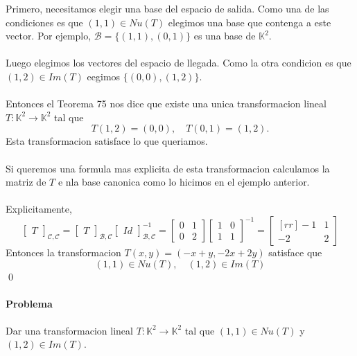\documentclass{article}
\theoremstyle{definition}
\theoremstyle{definition}
\theoremstyle{remark}
\begin{document}
Primero, necesitamos elegir una base del espacio de salida. Como una de las condiciones es que $(1,1) \in Nu(T)$ elegimos una base que contenga a este vector. Por ejemplo, $\mathcal{B}=\{(1,1),(0,1)\}$ es una base de $\mathbb{K}^2$. \\\\ Luego elegimos los vectores del espacio de llegada. Como la otra condicion es que $(1,2) \in Im(T)$ eegimos $\{(0,0),(1,2)\}$.\\\\ Entonces el Teorema 75 nos dice que existe una unica transformacion lineal $T : \mathbb{K}^2 \to \mathbb{K}^2$ tal que \[
T(1,2) =(0,0), \quad T(0,1)=(1,2).
\]
Esta transformacion satisface lo que queriamos. \\\\ Si queremos una formula mas explicita de esta transformacion calculamos la matriz de $T$ e nla base canonica como lo hicimos en el ejemplo anterior. \\\\ Explicitamente, \[
  \begin{bmatrix}T\end{bmatrix}_{\mathcal{C,C}}=\begin{bmatrix}T\end{bmatrix}_{\mathcal{B,C}}\begin{bmatrix}Id\end{bmatrix}_{\mathcal{B,C}}^{-1}=\begin{bmatrix}0 & 1 \\ 0 & 2 \end{bmatrix}\begin{bmatrix}1 & 0 \\ 1 & 1 \end{bmatrix}^{-1}=\begin{bmatrix}[rr] -1 & 1 \\ -2 & 2 \end{bmatrix}
\]
Entonces la transformacion $T(x,y)=(-x+y,-2x+2y)$ satisface que \[
  (1,1)\in Nu(T), \quad (1,2) \in Im(T)
\]
\qed\\\\
\textbf{Problema}\\\\ Dar una transformacion lineal $T : \mathbb{K}^2 \to \mathbb{K}^2$ tal que $(1,1)\in Nu(T)$ y $ (1,2) \in Im(T)$. \\\\
\end{document}

